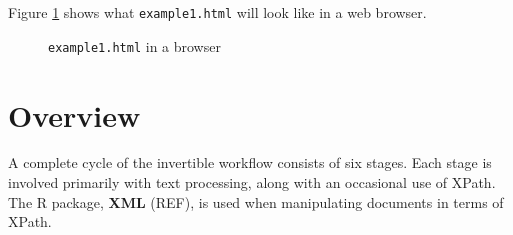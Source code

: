 \documentclass[a4paper, 12pt]{report}
\begin{document}
Figure \ref{fig:2.1} shows what \texttt{example1.html} will look like in a web browser.
\begin{figure}[h!]
\caption{\texttt{example1.html} in a browser}
\label{fig:2.1}
\end{figure}

\pagebreak
\section{Overview}
\label{sec:overview}

A complete cycle of the invertible workflow consists of six stages. Each stage is involved primarily with text processing, along with an occasional use of XPath. The R package, \textbf{XML} (REF), is used when manipulating documents in terms of XPath.
\end{document}
